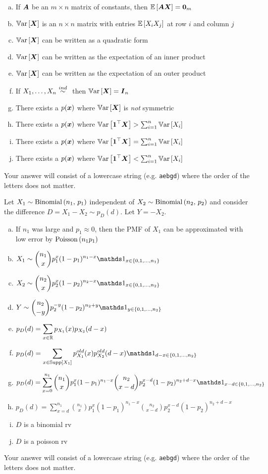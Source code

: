 \documentclass[12pt,landscape]{article}
\newcommand{\instr}{\small Your answer will consist of a lowercase string (e.g. \texttt{aebgd}) where the order of the letters does not matter. \normalsize}
\begin{document}
\begin{enumerate}[(a)]
\item If $\boldsymbol{A}$ be an $m \times n$ matrix of constants, then $\mathbb{E}\left[\boldsymbol{A}\boldsymbol{X}\right] = \boldsymbol{0}_m$
\item $\mathbb{V}\text{ar}\left[\boldsymbol{X}\right]$ is an $n \times n$ matrix with entries $\mathbb{E}\left[X_i X_j\right]$ at row $i$ and column $j$
\item $\mathbb{V}\text{ar}\left[\boldsymbol{X}\right]$ can be written as a quadratic form
\item $\mathbb{V}\text{ar}\left[\boldsymbol{X}\right]$ can be written as the expectation of an inner product 
\item $\mathbb{V}\text{ar}\left[\boldsymbol{X}\right]$ can be written as the expectation of an outer product 
\item If $\Xoneton \inddist$ then $\mathbb{V}\text{ar}\left[\boldsymbol{X}\right] = \boldsymbol{I}_n$
\item There exists a $p(\boldsymbol{x})$ where $\mathbb{V}\text{ar}\left[\boldsymbol{X}\right]$ is \emph{not} symmetric
\item There exists a $p(\boldsymbol{x})$ where $\mathbb{V}\text{ar}\left[\boldsymbol{1}^\top \boldsymbol{X}\right] > \sum_{i=1}^n \mathbb{V}\text{ar}\left[X_i\right]$
\item There exists a $p(\boldsymbol{x})$ where $\mathbb{V}\text{ar}\left[\boldsymbol{1}^\top \boldsymbol{X}\right] = \sum_{i=1}^n \mathbb{V}\text{ar}\left[X_i\right]$
\item There exists a $p(\boldsymbol{x})$ where $\mathbb{V}\text{ar}\left[\boldsymbol{1}^\top \boldsymbol{X}\right] < \sum_{i=1}^n \mathbb{V}\text{ar}\left[X_i\right]$
\end{enumerate}
\eenum\instr\pagebreak

\problem{} Let $X_1 \sim \mathrm{Binomial}\left(n_1,\,p_1\right)$ independent of $X_2 \sim \mathrm{Binomial}\left(n_2,\,p_2\right)$ and consider the difference $D = X_1 - X_2 \sim p_D(d)$. Let $Y = -X_2$.

\vspace{-0.2cm}\benum{} 

\begin{enumerate}[(a)]
\item If $n_1$ was large and $p_1 \approx 0$, then the PMF of $X_1$ can be approximated with low error by $\mathrm{Poisson}\left(n_1 p_1\right)$
\item $X_1 \sim \displaystyle \binom{n_1}{x} p_1^x (1-p_1)^{n_1 - x} \indic{x \in \braces{0, 1, \ldots, n_1}}$
\item $X_2 \sim \displaystyle \binom{n_2}{x} p_2^x (1-p_2)^{n_2 - x} \indic{x \in \braces{0, 1, \ldots, n_2}}$
\item $Y \sim \displaystyle \binom{n_2}{-y} p_2^{-y} (1-p_2)^{n_2 + y} \indic{y \in \braces{0, 1, \ldots, n_2}}$
\item $p_D(d) = \displaystyle\sum_{x \in \mathbb{R}} p_{X_1}(x) p_{X_2}(d - x)$
\item $p_D(d) = \displaystyle\sum_{x \in \support{X_1}} p_{X_1}^{old}(x) p_{X_2}^{old}(d - x) \indic{d-x \in \braces{0, 1, \ldots, n_2}}$
\item $p_D(d) = \displaystyle\sum_{x = 0}^{n_1} \binom{n_1}{x} p_1^x (1-p_1)^{n_1 - x} \binom{n_2}{x-d} p_2^{x-d} (1-p_2)^{n_2 + d - x} \indic{x-d \in \braces{0, 1, \ldots, n_2}}$
\item $p_D(d) = \displaystyle\sum_{x = d}^{n_1} \binom{n_1}{x} p_1^x (1-p_1)^{n_1 - x} \binom{n_2}{x-d} p_2^{x-d} (1-p_2)^{n_2 + d - x}$
\item $D$ is a binomial rv
\item $D$ is a poisson rv
\end{enumerate}
\eenum\instr\pagebreak
\end{document}
